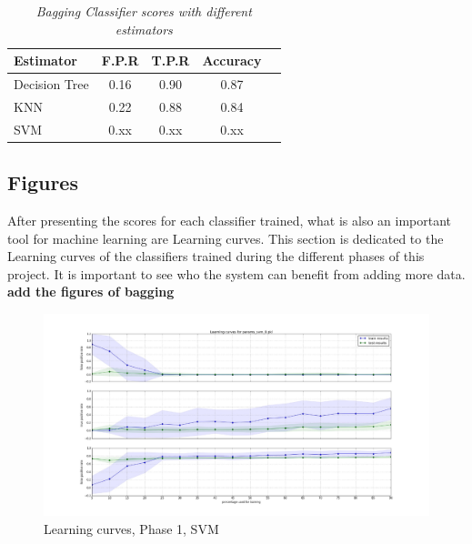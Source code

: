 \documentclass[10pt, conference, compsocconf]{IEEEtran}
\begin{document}
\begin{table}[hb]
\caption{\it Bagging Classifier scores with different estimators}
\vskip 0.1in
\begin{center}
\begin{small}
\begin{sc}
\begin{tabular}{|l|c|c|c|r|}
\hline
Estimator & F.P.R & T.P.R & Accuracy\\
\hline
Decision Tree & 0.16 & 0.90 & 0.87 \\
\hline
KNN & 0.22 & 0.88 & 0.84 \\
\hline
SVM & 0.xx & 0.xx & 0.xx \\
\hline
\end{tabular}
\end{sc}
\end{small}
\end{center}
\vskip -0.2in
\end{table}

\subsection{Figures}

After presenting the scores for each classifier trained, what is also an important tool for machine learning are Learning curves. This section is dedicated to the Learning curves of the classifiers trained during the different phases of this project. 
It is important to see who the system can benefit from adding more data. 
{\bf add the figures of bagging}

\begin{figure}[h]
\vskip 0.2in
\begin{center}
\centerline{\includegraphics[width=\columnwidth, scale=1]{./Figures/Lc_Ds1_P20-80_SVM}}
\caption{Learning curves, Phase 1, SVM}
\label{learning curves}
\end{center}
\vskip -0.2in
\end{figure} 
\end{document}

